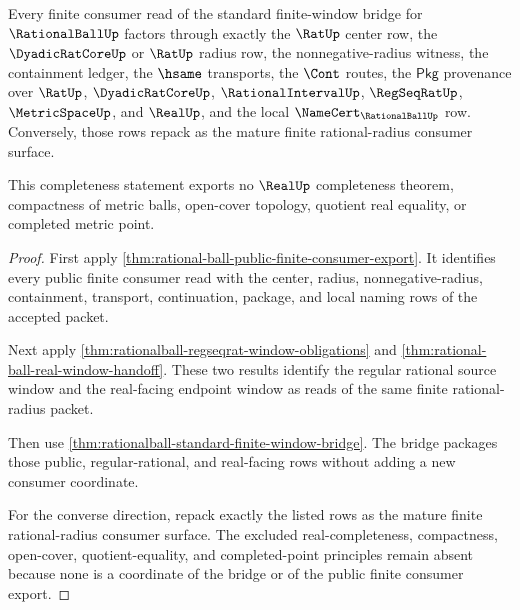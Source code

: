 \begin{theorem}
\label{thm:rationalball-mature-finite-consumer-completeness}
Every finite consumer read of the standard finite-window bridge for
$\RationalBallUp$ factors through exactly the $\RatUp$ center row, the
$\DyadicRatCoreUp$ or $\RatUp$ radius row, the nonnegative-radius witness, the
containment ledger, the $\hsame$ transports, the $\Cont$ routes, the
$\mathsf{Pkg}$ provenance over $\RatUp$, $\DyadicRatCoreUp$,
$\RationalIntervalUp$, $\RegSeqRatUp$, $\MetricSpaceUp$, and $\RealUp$, and
the local $\NameCert_{\RationalBallUp}$ row. Conversely, those rows repack as
the mature finite rational-radius consumer surface.

This completeness statement exports no $\RealUp$ completeness theorem,
compactness of metric balls, open-cover topology, quotient real equality, or
completed metric point.
\end{theorem}
\begin{proof}
First apply \autoref{thm:rational-ball-public-finite-consumer-export}. It
identifies every public finite consumer read with the center, radius,
nonnegative-radius, containment, transport, continuation, package, and local
naming rows of the accepted packet.

Next apply \autoref{thm:rationalball-regseqrat-window-obligations} and
\autoref{thm:rational-ball-real-window-handoff}. These two results identify
the regular rational source window and the real-facing endpoint window as
reads of the same finite rational-radius packet.

Then use \autoref{thm:rationalball-standard-finite-window-bridge}. The bridge
packages those public, regular-rational, and real-facing rows without adding a
new consumer coordinate.

For the converse direction, repack exactly the listed rows as the mature
finite rational-radius consumer surface. The excluded real-completeness,
compactness, open-cover, quotient-equality, and completed-point principles
remain absent because none is a coordinate of the bridge or of the public
finite consumer export.
\end{proof}


